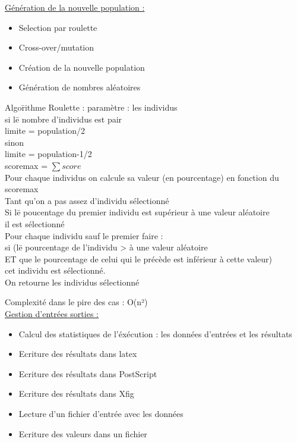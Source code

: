 \documentclass[a4paper,11pt]{article}
\begin{document}
		\underline{Génération de la nouvelle population : }
		\begin{itemize}
			\item Selection par roulette
			\item Cross-over/mutation
			\item Création de la nouvelle population
			\item Génération de nombres aléatoires
		\end{itemize}
		\begin{tabbing} 
		Algo\=rithme Roulette : paramètre : les individus\\
			\>si l\=e nombre d’individus est pair\\
			\>	\>limite = population/2\\
			\>sinon\\
			\>	\>limite = population-1/2\\
			\>scoremax = $\sum score$\\
			\>Pour chaque individus on calcule sa valeur (en pourcentage) en fonction du scoremax\\
			\>Tant qu’on a pas assez d’individu sélectionné\\
			\>	\>Si l\=e poucentage du premier individu est supérieur à une valeur aléatoire\\
			\>	\>\>il est sélectionné\\
			\>	\>Pour chaque individu sauf le premier faire :\\
			\>	\>\>si (l\=e pourcentage de l'individu > à une valeur aléatoire\\ 
			\>	\>\>ET que le pourcentage de celui qui le précède est inférieur à cette valeur)\\
			\>	\>\>\>cet individu est sélectionné.\\
			\>On retourne les individus sélectionné
		\end{tabbing}
		Complexité dans le pire des cas : O(n²)\\
		
		\underline{Gestion d'entrées sorties : }
		\begin{itemize}
			\item Calcul des statistiques de l'éxécution : les données d'entrées et les résultats
			\item Ecriture des résultats dans latex
			\item Ecriture des résultats dans PostScript
			\item Ecriture des résultats dans Xfig
			\item Lecture d'un fichier d'entrée avec les données
			\item Ecriture des valeurs dans un fichier\\
		\end{itemize}
		
\end{document}
